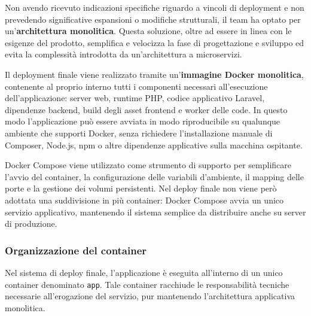 \documentclass[a4paper,10pt]{article}
\begin{document}
Non avendo ricevuto indicazioni specifiche riguardo a vincoli di deployment e non prevedendo significative espansioni o modifiche strutturali, il team ha optato per un'\textbf{architettura monolitica}. Questa soluzione, oltre ad essere in linea con le esigenze del prodotto, semplifica e velocizza la fase di progettazione e sviluppo ed evita la complessità introdotta da un'architettura a microservizi.

\vspace{1em}

Il deployment finale viene realizzato tramite un'\textbf{immagine Docker monolitica}, contenente al proprio interno tutti i componenti necessari all'esecuzione dell'applicazione: server web, runtime PHP, codice applicativo Laravel, dipendenze backend, build degli asset frontend e worker delle code. In questo modo l'applicazione può essere avviata in modo riproducibile su qualunque ambiente che supporti Docker, senza richiedere l'installazione manuale di Composer, Node.js, npm o altre dipendenze applicative sulla macchina ospitante.

\vspace{1em}

Docker Compose viene utilizzato come strumento di supporto per semplificare l'avvio del container, la configurazione delle variabili d'ambiente, il mapping delle porte e la gestione dei volumi persistenti. Nel deploy finale non viene però adottata una suddivisione in più container: Docker Compose avvia un unico servizio applicativo, mantenendo il sistema semplice da distribuire anche su server di produzione.

\subsubsection{Organizzazione del container}
Nel sistema di deploy finale, l'applicazione è eseguita all'interno di un unico container denominato \texttt{app}. Tale container racchiude le responsabilità tecniche necessarie all'erogazione del servizio, pur mantenendo l'architettura applicativa monolitica.
\end{document}
